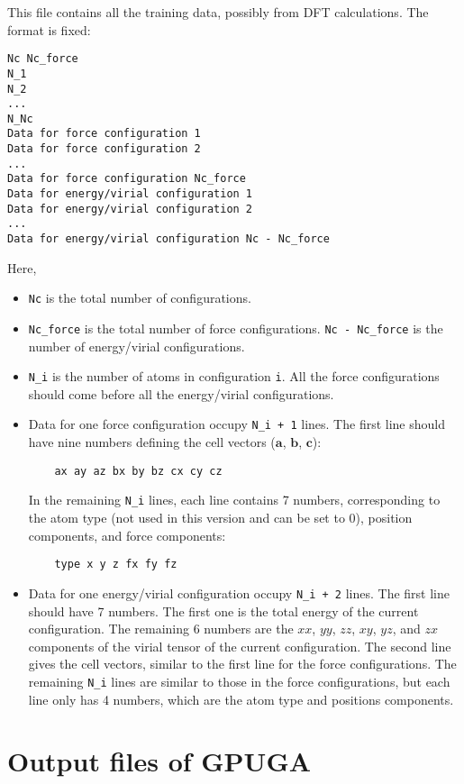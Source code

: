 \documentclass[12pt,a4paper]{report}
\newcommand{\vect}[1]{\boldsymbol{#1}}
\begin{document}
This file contains all the training data, possibly from DFT calculations. The format is fixed:
\begin{verbatim}
Nc Nc_force
N_1
N_2
...
N_Nc
Data for force configuration 1
Data for force configuration 2
...
Data for force configuration Nc_force
Data for energy/virial configuration 1
Data for energy/virial configuration 2
...
Data for energy/virial configuration Nc - Nc_force
\end{verbatim}
Here, 
\begin{itemize}
\item \verb"Nc" is the total number of configurations.
\item \verb"Nc_force" is the total number of force configurations. \verb"Nc - Nc_force" is the number of energy/virial configurations.
\item \verb"N_i" is the number of atoms in configuration \verb"i". All the force configurations should come before all the energy/virial configurations.
\item Data for one force configuration occupy \verb"N_i + 1" lines. The first line should have nine numbers defining the cell vectors ($\vect{a}$, $\vect{b}$, $\vect{c}$):
\begin{verbatim}
    ax ay az bx by bz cx cy cz
\end{verbatim} 
In the remaining \verb"N_i" lines, each line contains 7 numbers, corresponding to the atom type (not used in this version and can be set to 0), position components, and force components:
\begin{verbatim}
    type x y z fx fy fz
\end{verbatim} 
\item Data for one energy/virial configuration occupy \verb"N_i + 2" lines. The first line should have 7 numbers. The first one is the total energy of the current configuration. The remaining 6 numbers are the $xx$, $yy$, $zz$, $xy$, $yz$, and $zx$ components of the virial tensor of the current configuration. The second line gives the cell vectors, similar to the first line for the force configurations. The remaining \verb"N_i" lines are similar to those in the force configurations, but each line only has 4 numbers, which are the atom type and positions components.
\end{itemize}


\section{Output files of GPUGA}
\end{document}
